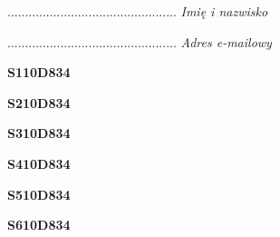 \begin{turn}{90}\begin{minipage}{\linewidth} \vspace{20mm} ................................................  \textit{Imię i nazwisko}\end{minipage}\end{turn}

\begin{turn}{90}\begin{minipage}{\linewidth} \vspace{20mm} ................................................  \textit{Adres e-mailowy}\end{minipage}\end{turn}

\begin{turn}{90}\huge \begin{minipage}{\linewidth} \vspace{10mm}\textbf{S110D834}\end{minipage}\end{turn}

\begin{turn}{90}\huge \begin{minipage}{\linewidth} \vspace{10mm}\textbf{S210D834}\end{minipage}\end{turn}

\begin{turn}{90}\huge \begin{minipage}{\linewidth} \vspace{10mm}\textbf{S310D834}\end{minipage}\end{turn}

\begin{turn}{90}\huge \begin{minipage}{\linewidth} \vspace{10mm}\textbf{S410D834}\end{minipage}\end{turn}

\begin{turn}{90}\huge \begin{minipage}{\linewidth} \vspace{10mm}\textbf{S510D834}\end{minipage}\end{turn}

\begin{turn}{90}\huge \begin{minipage}{\linewidth} \vspace{10mm}\textbf{S610D834}\end{minipage}\end{turn}

